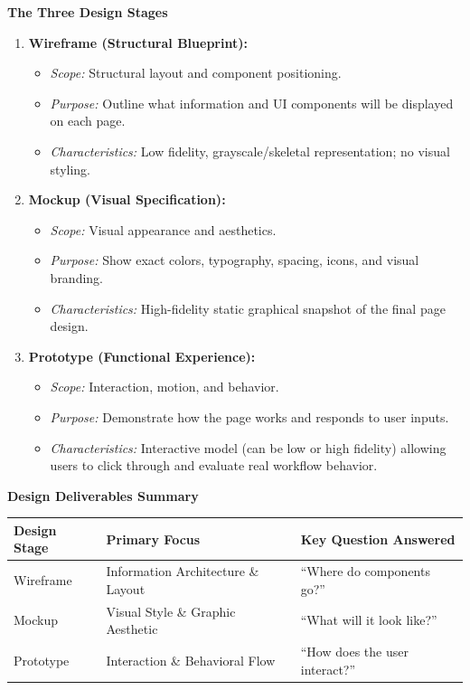 \documentclass[8pt, a4paper]{article}
\begin{document}
\begin{conceptbox}
\textbf{The Three Design Stages}
\begin{enumerate}
  \item \textbf{Wireframe (Structural Blueprint):}
    \begin{itemize}
      \item \textit{Scope:} Structural layout and component positioning.
      \item \textit{Purpose:} Outline what information and UI components will be displayed on each page.
      \item \textit{Characteristics:} Low fidelity, grayscale/skeletal representation; no visual styling.
    \end{itemize}
  \item \textbf{Mockup (Visual Specification):}
    \begin{itemize}
      \item \textit{Scope:} Visual appearance and aesthetics.
      \item \textit{Purpose:} Show exact colors, typography, spacing, icons, and visual branding.
      \item \textit{Characteristics:} High-fidelity static graphical snapshot of the final page design.
    \end{itemize}
  \item \textbf{Prototype (Functional Experience):}
    \begin{itemize}
      \item \textit{Scope:} Interaction, motion, and behavior.
      \item \textit{Purpose:} Demonstrate how the page works and responds to user inputs.
      \item \textit{Characteristics:} Interactive model (can be low or high fidelity) allowing users to
            click through and evaluate real workflow behavior.
    \end{itemize}
\end{enumerate}
\end{conceptbox}

\begin{conceptbox}
\textbf{Design Deliverables Summary}

\smallskip
\begin{tabularx}{\linewidth}{l l X}
  \toprule
  \textbf{Design Stage} & \textbf{Primary Focus} & \textbf{Key Question Answered} \\
  \midrule
  Wireframe  & Information Architecture \& Layout & ``Where do components go?'' \\
  Mockup     & Visual Style \& Graphic Aesthetic  & ``What will it look like?'' \\
  Prototype  & Interaction \& Behavioral Flow     & ``How does the user interact?'' \\
  \bottomrule
\end{tabularx}
\end{conceptbox}
\end{document}
